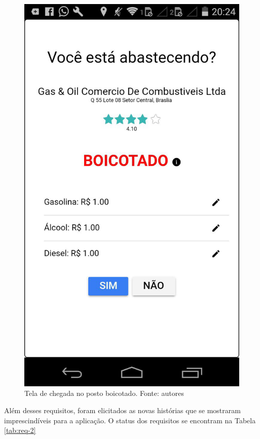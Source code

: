 \begin{figure}[H]
    \centering
    \includegraphics[scale=0.2]{figuras/chegou-posto.jpg}
    \caption[Tela de chegada no posto boicotado]{Tela de chegada no posto boicotado. Fonte: autores}
    \label{img:chegou-posto-boicotado}
\end{figure}

Além desses requisitos, foram elicitados as novas histórias que se mostraram imprescindíveis para a aplicação. O status dos requisitos se encontram na Tabela \ref{tab:req-2}

